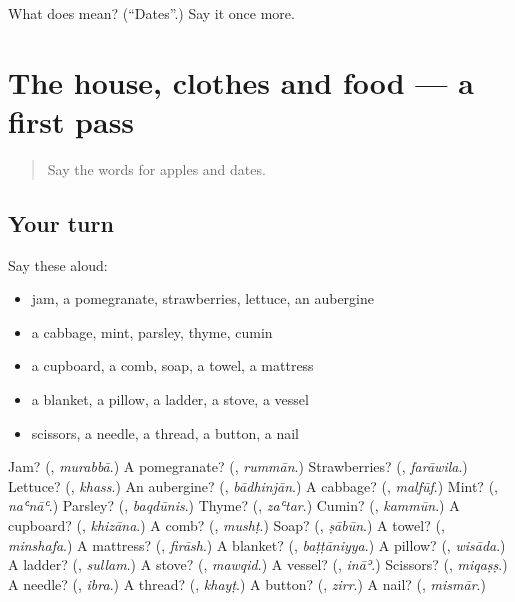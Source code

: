 \begin{tcolorbox}[breakable,colback=teal!4,colframe=teal!35!black,title={Before you move on}]
What does  mean? (\textquotedblleft{}Dates\textquotedblright{}.) Say it once more.
\end{tcolorbox}
\section[(dialogue)]{The house, clothes and food — a first pass}

\label{lesson:AR-R129-first-pass-the-house-clothes-and-food}



\begin{quote}
Say the words for apples and dates.
\end{quote}

\subsection*{Your turn}
Say these aloud:

\begin{itemize}
\raggedright
  \item jam, a pomegranate, strawberries, lettuce, an aubergine
  \item a cabbage, mint, parsley, thyme, cumin
  \item a cupboard, a comb, soap, a towel, a mattress
  \item a blanket, a pillow, a ladder, a stove, a vessel
  \item scissors, a needle, a thread, a button, a nail
\end{itemize}

\begin{tcolorbox}[breakable,colback=teal!4,colframe=teal!35!black,title={Before you move on}]
Jam? (\textbf{}, \emph{murabbā}.) A pomegranate? (\textbf{}, \emph{rummān}.) Strawberries? (\textbf{}, \emph{farāwila}.) Lettuce? (\textbf{}, \emph{khass}.) An aubergine? (\textbf{}, \emph{bādhinjān}.) A cabbage? (\textbf{}, \emph{malfūf}.) Mint? (\textbf{}, \emph{naʿnāʿ}.) Parsley? (\textbf{}, \emph{baqdūnis}.) Thyme? (\textbf{}, \emph{zaʿtar}.) Cumin? (\textbf{}, \emph{kammūn}.) A cupboard? (\textbf{}, \emph{khizāna}.) A comb? (\textbf{}, \emph{mushṭ}.) Soap? (\textbf{}, \emph{ṣābūn}.) A towel? (\textbf{}, \emph{minshafa}.) A mattress? (\textbf{}, \emph{firāsh}.) A blanket? (\textbf{}, \emph{baṭṭāniyya}.) A pillow? (\textbf{}, \emph{wisāda}.) A ladder? (\textbf{}, \emph{sullam}.) A stove? (\textbf{}, \emph{mawqid}.) A vessel? (\textbf{}, \emph{ināʾ}.) Scissors? (\textbf{}, \emph{miqaṣṣ}.) A needle? (\textbf{}, \emph{ibra}.) A thread? (\textbf{}, \emph{khayṭ}.) A button? (\textbf{}, \emph{zirr}.) A nail? (\textbf{}, \emph{mismār}.)
\end{tcolorbox}
